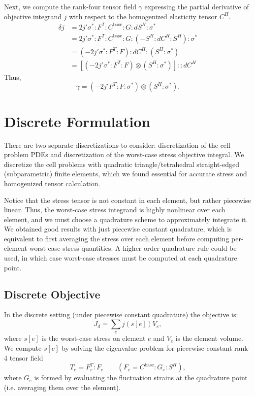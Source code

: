 \documentclass[10pt]{article}
\begin{document}
Next, we compute the rank-four tensor field $\gamma$ expressing the partial derivative
of objective integrand $j$ with respect to the homogenized elasticity tensor $C^H$.
\begin{align*}
    \delta j &=  2 j' \sigma^* : F^T : C^\text{base} : G : dS^H : \sigma^* \\
             &=  2 j' \sigma^* : F^T : C^\text{base} : G : (-S^H : dC^H : S^H) : \sigma^* \\
             &= (-2 j' \sigma^* : F^T : F) : dC^H : (S^H : \sigma^*) \\
             &= \left[(-2 j' \sigma^* : F^T : F) \otimes (S^H : \sigma^*)\right] :: dC^H
\end{align*}
Thus,
\begin{equation}
\label{eqn:gamma}
\boxed{
    \gamma = (-2 j' F^T : F : \sigma^*) \otimes (S^H : \sigma^*).
}
\end{equation}

\section{Discrete Formulation}
There are two separate discretizations to consider: discretization of the cell
problem PDEs and discretization of the worst-case stress objective integral.
We discretize the cell problems with quadratic triangle/tetrahedral
straight-edged (subparametric) finite elements, which we found essential for
accurate stress and homogenized tensor calculation.

Notice that the stress tensor is not constant in each element, but rather
piecewise linear. Thus, the worst-case stress integrand is highly nonlinear
over each element, and we must choose a quadrature scheme to approximately
integrate it. We obtained good results with just piecewise constant quadrature,
which is equivalent to first averaging the stress over each element before
computing per-element worst-case stress quantities. A higher order quadrature
rule could be used, in which case worst-case stresses must be computed at each
quadrature point.

\subsection{Discrete Objective}
In the discrete setting (under piecewise constant quadrature) the objective is:
$$
J_d = \sum_{e} j(s[e]) V_e,
$$
where $s[e]$ is the worst-case stress on element $e$ and $V_e$ is 
the element volume. We compute $s[e]$ by solving the eigenvalue problem for
piecewise constant rank-4 tensor field
$$
T_e = F^T_e : F_e \quad \quad (F_e = C^\text{base} : G_e : S^H),
$$
where $G_e$ is formed by evaluating the fluctuation strains at the quadrature
point (i.e. averaging them over the element).
\end{document}

